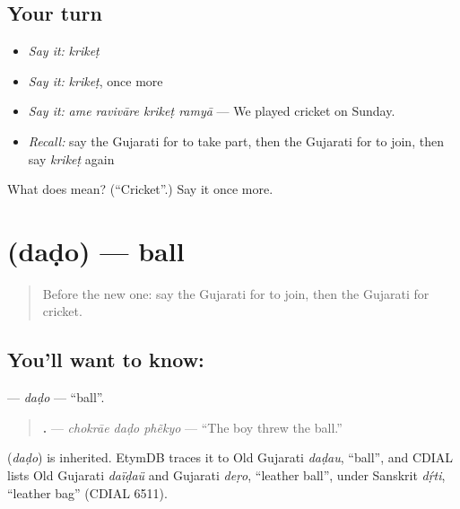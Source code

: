 \subsection*{Your turn}
\begin{itemize}
\raggedright
  \item \emph{Say it:} \emph{krikeṭ}
  \item \emph{Say it:} \emph{krikeṭ}, once more
  \item \emph{Say it:} \emph{ame ravivāre krikeṭ ramyā} — We played cricket on Sunday.
  \item \emph{Recall:} say the Gujarati for to take part, then the Gujarati for to join, then say \emph{krikeṭ} again
\end{itemize}

\begin{tcolorbox}[breakable,colback=teal!4,colframe=teal!35!black,title={Before you move on}]
What does  mean? (\textquotedblleft{}Cricket\textquotedblright{}.) Say it once more.
\end{tcolorbox}
\section[\texorpdfstring{\gu{દડો} (daḍo)}{દડો (daḍo)}]{ (daḍo) — ball}

\label{lesson:GU-C258-dado}



\begin{quote}
Before the new one: say the Gujarati for to join, then the Gujarati for cricket.
\end{quote}

\subsection*{You'll want to know: }
\textbf{} — \emph{daḍo} — \textquotedblleft{}ball\textquotedblright{}.

\begin{quote}
\textbf{  .} — \emph{chokrāe daḍo phẽkyo} — \textquotedblleft{}The boy threw the ball.\textquotedblright{}
\end{quote}

\begin{cousinweb}
\textbf{} (\emph{daḍo}) is inherited. EtymDB traces it to Old Gujarati \emph{daḍau}, \textquotedblleft{}ball\textquotedblright{}, and CDIAL lists Old Gujarati \emph{daïḍaü} and Gujarati \emph{deṛo}, \textquotedblleft{}leather ball\textquotedblright{}, under Sanskrit \emph{dṛ́ti}, \textquotedblleft{}leather bag\textquotedblright{} (CDIAL 6511).
\end{cousinweb}

